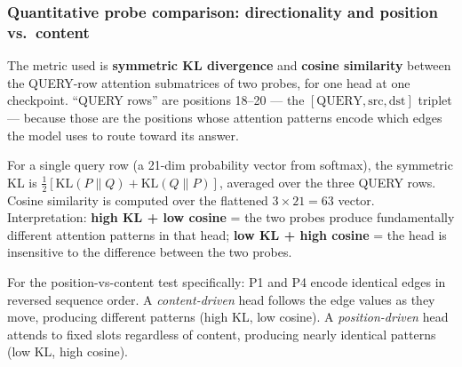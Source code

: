 \documentclass[11pt, a4paper]{article}
\begin{document}
\subsubsection{Quantitative probe comparison: directionality and position vs.\ content}
\label{sec:probe-comparison}

The metric used is \textbf{symmetric KL divergence} and \textbf{cosine similarity}
between the QUERY-row attention submatrices of two probes, for one head at one
checkpoint. ``QUERY rows'' are positions 18--20 — the $[\text{QUERY},
\text{src}, \text{dst}]$ triplet — because those are the positions whose
attention patterns encode which edges the model uses to route toward its answer.

For a single query row (a 21-dim probability vector from softmax), the symmetric
KL is $\frac{1}{2}[\text{KL}(P\|Q) + \text{KL}(Q\|P)]$, averaged over the three
QUERY rows.  Cosine similarity is computed over the flattened $3 \times 21 = 63$
vector.  Interpretation: \textbf{high KL + low cosine} = the two probes produce
fundamentally different attention patterns in that head; \textbf{low KL + high
cosine} = the head is insensitive to the difference between the two probes.

For the position-vs-content test specifically: P1 and P4 encode identical edges
in reversed sequence order.  A \emph{content-driven} head follows the edge values
as they move, producing different patterns (high KL, low cosine).  A
\emph{position-driven} head attends to fixed slots regardless of content,
producing nearly identical patterns (low KL, high cosine).
\end{document}
